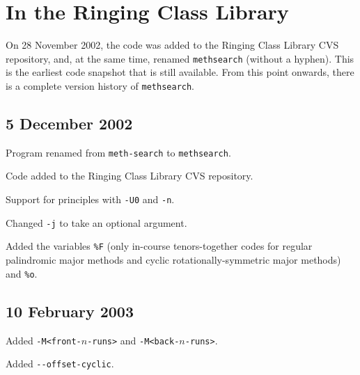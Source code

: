 \documentclass[a4paper,11pt,oneside]{book}
\def\methsearch{\texttt{meth\-search}}
\begin{document}
\section{In the Ringing Class Library}

On 28 November 2002, the code was added to the Ringing Class Library%
 CVS repository, and, at the
same time, renamed \verb+methsearch+ (without a hyphen).  This is the 
earliest code snapshot that is still available.  From this point onwards,
there is a complete version history of \methsearch.

\subsection{5 December 2002}
\begin{list}{}{\leftmargin=1em}
\item Program renamed from \texttt{meth-search} to \methsearch.
\item Code added to the Ringing Class Library CVS repository.
\item Support for principles with \verb+-U0+ and \verb+-n+.
\item Changed \verb+-j+ to take an optional argument.
\item Added the variables \verb+%F+ (only in-course tenors-together codes
for regular palindromic major methods and cyclic rotationally-symmetric
major methods) and \verb+%o+.
\end{list}

\subsection{10 February 2003}
\begin{list}{}{\leftmargin=1em}
\item Added \verb+-M<front-+$n$\verb+-runs>+ and 
\verb+-M<back-+$n$\verb+-runs>+.
\item Added \verb+--offset-cyclic+.
\end{list}
\end{document}
